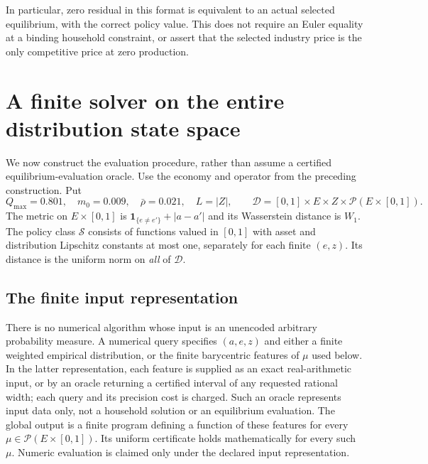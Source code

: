\documentclass[11pt,a4paper]{article}
\begin{document}
In particular, zero residual in this format is equivalent to an actual
selected equilibrium, with the correct policy value. This does not
require an Euler equality at a binding household constraint, or assert
that the selected industry price is the only competitive price at zero
production.

\section{A finite solver on the entire distribution state space}
\label{sec:finite-solver}

We now construct the evaluation procedure, rather than assume a certified
equilibrium-evaluation oracle. Use the economy and operator from the
preceding construction. Put
\[
 Q_{\max}=0.801,\quad m_0=0.009,\quad \bar\rho=0.021,\quad
 L=|Z|,\qquad
 \mathcal D=[0,1]\times E\times Z\times\mathcal P(E\times[0,1]).
 \tag{S1}
\]
The metric on $E\times[0,1]$ is
$\mathbf1_{\{e\ne e'\}}+|a-a'|$ and its Wasserstein distance is $W_1$.
The policy class $\mathcal S$ consists of functions valued in $[0,1]$
with asset and distribution Lipschitz constants at most one, separately
for each finite $(e,z)$. Its distance is the uniform norm on
\emph{all} of $\mathcal D$.

\subsection{The finite input representation}
There is no numerical algorithm whose input is an unencoded arbitrary
probability measure. A numerical query specifies $(a,e,z)$ and either a
finite weighted empirical distribution, or the finite barycentric
features of $\mu$ used below. In the latter representation, each feature
is supplied as an exact real-arithmetic input, or by an oracle returning
a certified interval of any requested rational width; each query and its
precision cost is charged. Such an oracle represents input data only,
not a household solution or an equilibrium evaluation. The global output
is a finite program defining a function of these features for every
$\mu\in\mathcal P(E\times[0,1])$. Its uniform certificate holds
mathematically for every such $\mu$. Numeric evaluation is claimed only
under the declared input representation.
\end{document}

